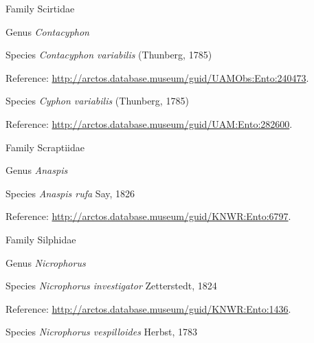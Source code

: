 \documentclass[9pt, article]{memoir}
\begin{document}
\begin{multicols}{2}
\vspace{6pt}\noindent\hspace{24pt}Family Scirtidae


\vspace{6pt}\noindent\hspace{30pt}Genus \textit{Contacyphon}


\vspace{6pt}\noindent\hspace{36pt}Species \textit{Contacyphon variabilis} (Thunberg, 1785)


\vspace{6pt}Reference: 
\url{http://arctos.database.museum/guid/UAMObs:Ento:240473}.

\vspace{6pt}\noindent\hspace{36pt}Species \textit{Cyphon variabilis} (Thunberg, 1785)


\vspace{6pt}Reference: 
\url{http://arctos.database.museum/guid/UAM:Ento:282600}.

\vspace{6pt}\noindent\hspace{24pt}Family Scraptiidae


\vspace{6pt}\noindent\hspace{30pt}Genus \textit{Anaspis}


\vspace{6pt}\noindent\hspace{36pt}Species \textit{Anaspis rufa} Say, 1826


\vspace{6pt}Reference: 
\url{http://arctos.database.museum/guid/KNWR:Ento:6797}.

\vspace{6pt}\noindent\hspace{24pt}Family Silphidae


\vspace{6pt}\noindent\hspace{30pt}Genus \textit{Nicrophorus}


\vspace{6pt}\noindent\hspace{36pt}Species \textit{Nicrophorus investigator} Zetterstedt, 1824


\vspace{6pt}Reference: 
\url{http://arctos.database.museum/guid/KNWR:Ento:1436}.

\vspace{6pt}\noindent\hspace{36pt}Species \textit{Nicrophorus vespilloides} Herbst, 1783



\end{multicols}
\end{document}
